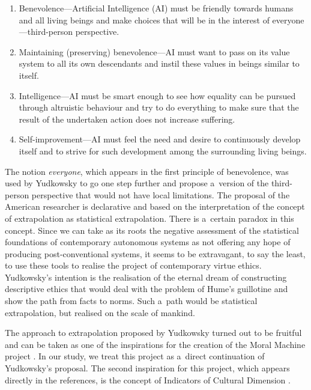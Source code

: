 \begin{enumerate}
\item Benevolence—Artificial Intelligence (AI) must be friendly towards humans and all living beings and make choices that will be in the interest of everyone—third-person perspective.
\item Maintaining (preserving) benevolence—AI must want to pass on its value system to all its own descendants and instil these values in beings similar to itself.
\item Intelligence—AI must be smart enough to see how equality can be pursued through altruistic behaviour and try to do everything to make sure that the result of the undertaken action does not increase suffering.
\item Self-improvement—AI must feel the need and desire to continuously develop itself and to strive for such development among the surrounding living beings.
\end{enumerate}
The notion \textit{everyone}, which appears in the first principle of benevolence, was used by Yudkowsky to go one step further and propose a~version of the third-person perspective that would not have local limitations. The proposal of the American researcher is declarative and based on the interpretation of the concept of extrapolation as statistical extrapolation. There is a~certain paradox in this concept. Since we can take as its roots the negative assessment of the statistical foundations of contemporary autonomous systems as not offering any hope of producing post-conventional systems, it seems to be extravagant, to say the least, to use these tools to realise the project of contemporary virtue ethics. Yudkowsky's intention is the realisation of the eternal dream of constructing descriptive ethics that would deal with the problem of Hume's guillotine and show the path from facts to norms. Such a~path would be statistical extrapolation, but realised on the scale of mankind.

The approach to extrapolation proposed by Yudkowsky turned out to be fruitful and can be taken as one of the inspirations for the creation of the Moral Machine project
\parencite[][]{awad_universals_2020}. %
 In our study, we treat this project as a~direct continuation of Yudkowsky's proposal. The second inspiration for this project, which appears directly in the references, is the concept of Indicators of Cultural Dimension 
\parencite[][]{hofstede_cultures_2010}.%


